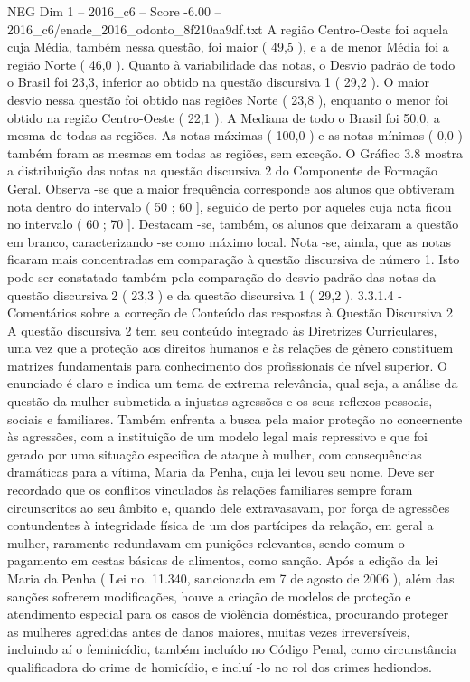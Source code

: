 \begin{textsample}{NEG Dim 1 – 2016\_c6 – Score -6.00 – 2016\_c6/enade\_2016\_odonto\_8f210aa9df.txt}
A região Centro-Oeste foi aquela cuja Média, também nessa questão, foi maior ( 49,5 ), e a de menor Média foi a região Norte ( 46,0 ).
Quanto à variabilidade das notas, o Desvio padrão de todo o Brasil foi 23,3, inferior ao obtido na questão discursiva 1 ( 29,2 ).
O maior desvio nessa questão foi obtido nas regiões Norte ( 23,8 ), enquanto o menor foi obtido na região Centro-Oeste ( 22,1 ).
A Mediana de todo o Brasil foi 50,0, a mesma de todas as regiões.
As notas máximas ( 100,0 ) e as notas mínimas ( 0,0 ) também foram as mesmas em todas as regiões, sem exceção.
O Gráfico 3.8 mostra a distribuição das notas na questão discursiva 2 do Componente de Formação Geral.
Observa -se que a maior frequência corresponde aos alunos que obtiveram nota dentro do intervalo ( 50 ; 60 ], seguido de perto por aqueles cuja nota ficou no intervalo ( 60 ; 70 ].
Destacam -se, também, os alunos que deixaram a questão em branco, caracterizando -se como máximo local.
Nota -se, ainda, que as notas ficaram mais concentradas em comparação à questão discursiva de número 1.
Isto pode ser constatado também pela comparação do desvio padrão das notas da questão discursiva 2 ( 23,3 ) e da questão discursiva 1 ( 29,2 ). 3.3.1.4 - Comentários sobre a correção de Conteúdo das respostas à Questão Discursiva 2 A questão discursiva 2 tem seu conteúdo integrado às Diretrizes Curriculares, uma vez que a proteção aos direitos humanos e às relações de gênero constituem matrizes fundamentais para conhecimento dos profissionais de nível superior.
O enunciado é claro e indica um tema de extrema relevância, qual seja, a análise da questão da mulher submetida a injustas agressões e os seus reflexos pessoais, sociais e familiares.
Também enfrenta a busca pela maior proteção no concernente às agressões, com a instituição de um modelo legal mais repressivo e que foi gerado por uma situação especifica de ataque à mulher, com consequências dramáticas para a vítima, Maria da Penha, cuja lei levou seu nome.
Deve ser recordado que os conflitos vinculados às relações familiares sempre foram circunscritos ao seu âmbito e, quando dele extravasavam, por força de agressões contundentes à integridade física de um dos partícipes da relação, em geral a mulher, raramente redundavam em punições relevantes, sendo comum o pagamento em cestas básicas de alimentos, como sanção.
Após a edição da lei Maria da Penha ( Lei no. 11.340, sancionada em 7 de agosto de 2006 ), além das sanções sofrerem modificações, houve a criação de modelos de proteção e atendimento especial para os casos de violência doméstica, procurando proteger as mulheres agredidas antes de danos maiores, muitas vezes irreversíveis, incluindo aí o feminicídio, também incluído no Código Penal, como circunstância qualificadora do crime de homicídio, e incluí -lo no rol dos crimes hediondos.

\end{textsample}
